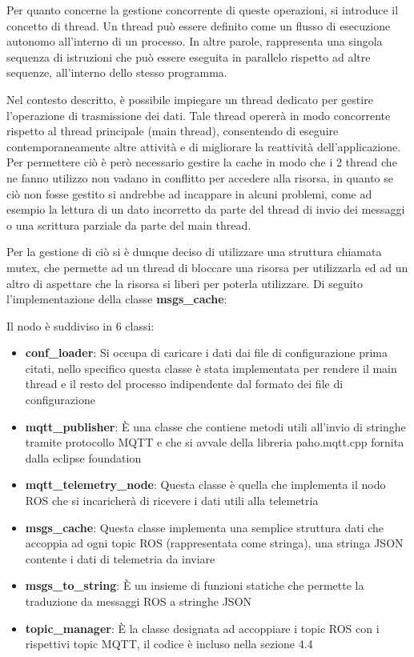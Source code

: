 \noindent Per quanto concerne la gestione concorrente di queste operazioni, si introduce il concetto di thread. Un thread può essere definito come un flusso di esecuzione autonomo all'interno di un processo. In altre parole, rappresenta una singola sequenza di istruzioni che può essere eseguita in parallelo rispetto ad altre sequenze, all'interno dello stesso programma.

\noindent Nel contesto descritto, è possibile impiegare un thread dedicato per gestire l'operazione di trasmissione dei dati. Tale thread opererà in modo concorrente rispetto al thread principale (main thread), consentendo di eseguire contemporaneamente altre attività e di migliorare la reattività dell'applicazione. Per permettere ciò è però necessario gestire la cache in modo che i 2 thread che ne fanno utilizzo non vadano in conflitto per accedere alla risorsa, in quanto se ciò non fosse gestito si andrebbe ad incappare in alcuni problemi, come ad esempio la lettura di un dato incorretto da parte del thread di invio dei messaggi o una scrittura parziale da parte del main thread.

\noindent Per la gestione di ciò si è dunque deciso di utilizzare una struttura chiamata mutex, che permette ad un thread di bloccare una risorsa per utilizzarla ed ad un altro di aspettare che la risorsa si liberi per poterla utilizzare. Di seguito l'implementazione della classe \textbf{msgs\_cache}:



\noindent Il nodo è suddiviso in 6 classi:

\begin{itemize}
  \item \textbf{conf\_loader}: Si occupa di caricare i dati dai file di configurazione prima citati, nello specifico questa classe è stata implementata per rendere il main thread e il resto del processo indipendente dal formato dei file di configurazione
  \item \textbf{mqtt\_publisher}: È una classe che contiene metodi utili all'invio di stringhe tramite protocollo MQTT e che si avvale della libreria paho.mqtt.cpp fornita dalla eclipse foundation 
  \item \textbf{mqtt\_telemetry\_node}: Questa classe è quella che implementa il nodo ROS che si incaricherà di ricevere i dati utili alla telemetria
  \item \textbf{msgs\_cache}: Questa classe implementa una semplice struttura dati che accoppia ad ogni topic ROS (rappresentata come stringa), una stringa JSON contente i dati di telemetria da inviare
  \item \textbf{msgs\_to\_string}: È un insieme di funzioni statiche che permette la traduzione da messaggi ROS a stringhe JSON
  \item \textbf{topic\_manager}: È la classe designata ad accoppiare i topic ROS con i rispettivi topic MQTT, il codice è incluso nella sezione 4.4 
\end{itemize}

